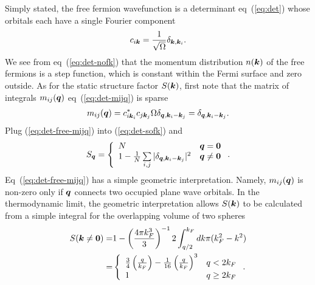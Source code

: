 Simply stated, the free fermion wavefunction is a determinant eq~(\ref{eq:det}) whose orbitals each have a single Fourier component
\begin{align}
c_{i\boldsymbol{k}} = \frac{1}{\sqrt{\Omega}} \delta_{\boldsymbol{k},\boldsymbol{k}_i}.
\end{align}
We see from eq~(\ref{eq:det-nofk}) that the momentum distribution $n(\boldsymbol{k})$ of the free fermions is a step function, which is constant within the Fermi surface and zero outside. As for the static structure factor $S(\boldsymbol{k})$, first note that the matrix of integrals $m_{ij}(\boldsymbol{q})$ eq~(\ref{eq:det-mijq}) is sparse
\begin{align}
m_{ij}(\boldsymbol{q}) = c_{i\boldsymbol{k}_i}^* c_{j\boldsymbol{k}_j} \Omega\delta_{\boldsymbol{q}, \boldsymbol{k}_i-\boldsymbol{k}_j} = \delta_{\boldsymbol{q}, \boldsymbol{k}_i-\boldsymbol{k}_j}. \label{eq:det-free-mijq}
\end{align}
Plug (\ref{eq:det-free-mijq}) into (\ref{eq:det-sofk}) and
\begin{align}
S_{\boldsymbol{q}} = \left\{
\begin{array}{lr}
N & \boldsymbol{q}=\boldsymbol{0} \\
 1-\frac{1}{N}\sum\limits_{i, j} \vert \delta_{\boldsymbol{q}, \boldsymbol{k}_i-\boldsymbol{k}_j} \vert^2 & \boldsymbol{q}\neq\boldsymbol{0}
\end{array}\right..
\end{align}
Eq~(\ref{eq:det-free-mijq}) has a simple geometric interpretation. Namely, $m_{ij}(\boldsymbol{q})$ is non-zero only if $\boldsymbol{q}$ connects two occupied plane wave orbitals. In the thermodynamic limit, the geometric interpretation allows $S(\boldsymbol{k})$ to be calculated from a simple integral for the overlapping volume of two spheres
\begin{align}
S(\boldsymbol{k}\neq\boldsymbol{0}) =& 1-\left(\frac{4\pi k_F^3}{3}\right)^{-1}2\int_{q/2}^{k_F} dk \pi(k_F^2-k^2) \nonumber \\
=& \left\{ \begin{array}{lr}
\frac{3}{4}\left(\frac{q}{k_F}\right) - \frac{1}{16} \left(\frac{q}{k_F}\right)^3 & q<2k_F\\
1 & q\ge 2k_F
\end{array}\right..
\end{align}